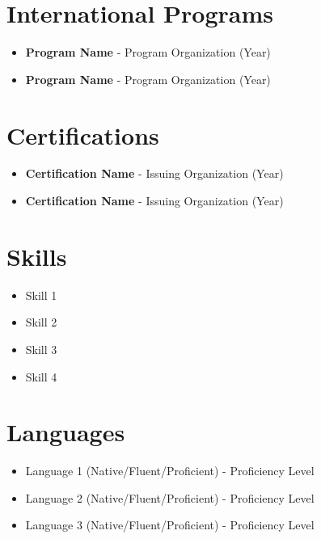 \documentclass[11pt,a4paper]{article}
\begin{document}

\section*{International Programs}
\begin{itemize}[leftmargin=*, nosep]
    \item \textbf{Program Name} - Program Organization (Year)
    \item \textbf{Program Name} - Program Organization (Year)
\end{itemize}

\section*{Certifications}
\begin{itemize}[leftmargin=*, nosep]
    \item \textbf{Certification Name} - Issuing Organization (Year)
    \item \textbf{Certification Name} - Issuing Organization (Year)
\end{itemize}

\section*{Skills}
\begin{itemize}[leftmargin=*, nosep]
    \item Skill 1
    \item Skill 2
    \item Skill 3
    \item Skill 4
\end{itemize}

\section*{Languages}
\begin{itemize}[leftmargin=*, nosep]
    \item Language 1 (Native/Fluent/Proficient) - Proficiency Level
    \item Language 2 (Native/Fluent/Proficient) - Proficiency Level
    \item Language 3 (Native/Fluent/Proficient) - Proficiency Level
\end{itemize}
\end{document}
